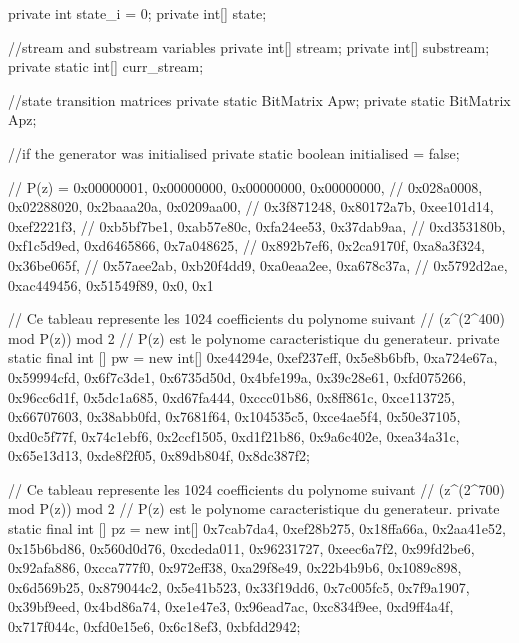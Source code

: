 \begin{code}
\begin{hide}
{   private int state_i = 0;
   private int[] state;

   //stream and substream variables
   private int[] stream;
   private int[] substream;
   private static int[] curr_stream;

   //state transition matrices
   private static BitMatrix Apw;
   private static BitMatrix Apz;

   //if the generator was initialised
   private static boolean initialised = false;

   // P(z) = {0x00000001, 0x00000000, 0x00000000, 0x00000000,
   //         0x028a0008, 0x02288020, 0x2baaa20a, 0x0209aa00,
   //         0x3f871248, 0x80172a7b, 0xee101d14, 0xef2221f3,
   //         0xb5bf7be1, 0xab57e80c, 0xfa24ee53, 0x37dab9aa,
   //         0xd353180b, 0xf1c5d9ed, 0xd6465866, 0x7a048625,
   //         0x892b7ef6, 0x2ca9170f, 0xa8a3f324, 0x36be065f,
   //         0x57aee2ab, 0xb20f4dd9, 0xa0eaa2ee, 0xa678c37a,
   //         0x5792d2ae, 0xac449456, 0x51549f89, 0x0, 0x1}

   // Ce tableau represente les 1024 coefficients du polynome suivant
   // (z^(2^400) mod P(z)) mod 2
   // P(z) est le polynome caracteristique du generateur.
   private static final int [] pw = new int[]
                        { 0xe44294e, 0xef237eff, 0x5e8b6bfb, 0xa724e67a,
                         0x59994cfd, 0x6f7c3de1, 0x6735d50d, 0x4bfe199a,
                         0x39c28e61, 0xfd075266, 0x96cc6d1f, 0x5dc1a685,
                         0xd67fa444, 0xccc01b86,  0x8ff861c, 0xce113725,
                         0x66707603, 0x38abb0fd,  0x7681f64, 0x104535c5,
                         0xce4ae5f4, 0x50e37105, 0xd0c5f77f, 0x74c1ebf6,
                         0x2ccf1505, 0xd1f21b86, 0x9a6c402e, 0xea34a31c,
                         0x65e13d13, 0xde8f2f05, 0x89db804f, 0x8dc387f2};

   // Ce tableau represente les 1024 coefficients du polynome suivant
   // (z^(2^700) mod P(z)) mod 2
   // P(z) est le polynome caracteristique du generateur.
   private static final int [] pz = new int[]
                        {0x7cab7da4, 0xef28b275, 0x18ffa66a, 0x2aa41e52,
                         0x15b6bd86, 0x560d0d76, 0xcdeda011, 0x96231727,
                         0xeec6a7f2, 0x99fd2be6, 0x92afa886, 0xcca777f0,
                         0x972eff38, 0xa29f8e49, 0x22b4b9b6, 0x1089c898,
                         0x6d569b25, 0x879044c2, 0x5e41b523, 0x33f19dd6,
                         0x7c005fc5, 0x7f9a1907, 0x39bf9eed, 0x4bd86a74,
                          0xe1e47e3, 0x96ead7ac, 0xc834f9ee, 0xd9ff4a4f,
                         0x717f044c, 0xfd0e15e6,  0x6c18ef3, 0xbfdd2942};

}
\end{hide}
\end{code}
